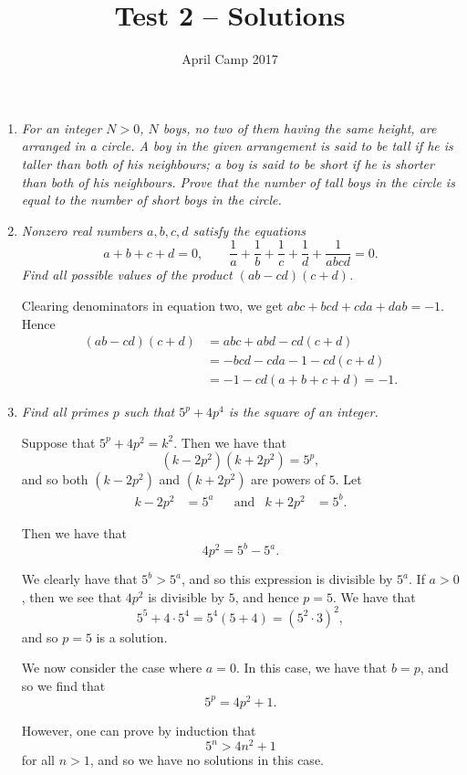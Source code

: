 \documentclass[a4paper,12pt]{article}
\author{April Camp 2017}
\title{Test 2 -- Solutions}
\date{}
\begin{document}
 \maketitle

\begin{enumerate}
	\item 
	\textit{For an integer $N>0$, $N$ boys, no two of them having the same height, are arranged in a circle. A boy in the given arrangement is said to be \emph{tall} if he is taller than both of his neighbours; a boy is said to be \emph{short} if he is shorter than both of his neighbours. Prove that the number of tall boys in the circle is equal to the number of short boys in the circle.}
	
	
		
	\item 
	\textit{Nonzero real numbers $a,b,c,d$ satisfy the equations \[a+b+c+d = 0, \qquad \frac{1}{a}+\frac{1}{b}+\frac{1}{c}+\frac{1}{d}+\frac{1}{abcd} = 0.\]
	Find all possible values of the product $(ab-cd)(c+d)$.}
	
	Clearing denominators in equation two, we get $abc +bcd +cda +dab = -1$. Hence \begin{align*} (ab-cd)(c+d) &= abc +abd -cd(c+d) \\ &= -bcd -cda -1 -cd(c+d) \\ &= -1 -cd(a+b+c+d) = -1.\end{align*}
	
	\item
	\textit{Find all primes $p$ such that $5^p +4p^4$ is the square of an integer.}
	
Suppose that $5^p + 4p^2 = k^2$. Then we have that
\[
	(k - 2p^2)(k + 2p^2) = 5^p,
\]
and so both $(k - 2p^2)$ and $(k + 2p^2)$ are powers of $5$. Let
\begin{align*}
	k - 2p^2 & = 5^a & & \text{and} & k + 2p^2 & = 5^b.
\end{align*}

Then we have that
\[
	4p^2 = 5^b - 5^a.
\]

We clearly have that $5^b > 5^a$, and so this expression is divisible by $5^a$.
If $a > 0$, then we see that $4p^2$ is divisible by $5$, and hence $p=5$.
We have that
\[
	5^5 + 4\cdot 5^4 = 5^4 (5 + 4) = (5^2 \cdot 3)^2,
\]
and so $p=5$ is a solution.

We now consider the case where $a=0$. In this case, we have that $b=p$, and so
we find that
\[
	5^p = 4p^2 + 1.
\]

However, one can prove by induction that
\[
	5^n > 4n^2 + 1
\]
for all $n > 1$, and so we have no solutions in this case.
	

\end{enumerate}
\end{document}
